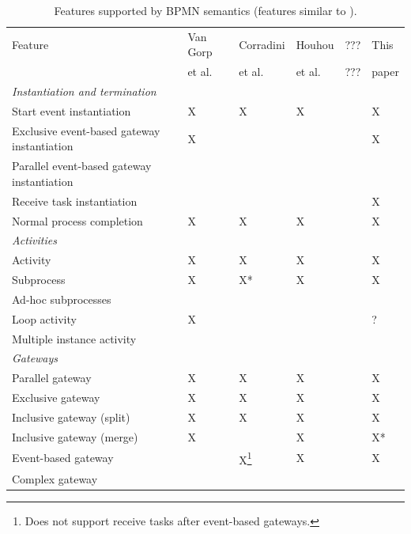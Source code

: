 \documentclass[adraft, copyright, creativecommons]{eptcs} %
\begin{document}
\begin{table}[htbp]

    \caption{Features supported by BPMN semantics (features similar to \cite{vangorpVisualTokenbasedFormalization2013}).}
    \label{tab:supportedFeatures}
    \begin{tabular}{l l l l l l} %
    \hline
      Feature & Van Gorp &  Corradini & Houhou & ??? & This\\
      & et al. \cite{vangorpVisualTokenbasedFormalization2013} & et al. \cite{corradiniFormalApproachAnalysis2021}& et al. \cite{houhouFirstOrderLogicSemantics2019, houhouFirstOrderLogicVerification2022} & ??? & paper\\
      \hline
      \textit{Instantiation and termination} & & &\\
      Start event instantiation & X & X & X & & X\\
      Exclusive event-based gateway instantiation & X & & & & X\\
      Parallel event-based gateway instantiation &  & & & & \\
      Receive task instantiation & & & & & X\\
      Normal process completion & X & X & X & & X\\
      \textit{Activities} & & & & &\\
      Activity & X & X & X & & X\\
      Subprocess & X & X* & X & & X\\
      Ad-hoc subprocesses & & & & &\\
      Loop activity & X & & & & ?\\
      Multiple instance activity & & & & & \\
      \textit{Gateways} & & & & &\\
      Parallel gateway & X & X & X & & X\\
      Exclusive gateway & X & X & X & & X\\
      Inclusive gateway (split) & X & X & X & & X\\
      Inclusive gateway (merge) & X & & X & & X*\\
      Event-based gateway &  & X\footnote{Does not support receive tasks after event-based gateways.} & X & & X\\ %
      Complex gateway & & & & &\\

\end{tabular}
\end{table}
\end{document}
